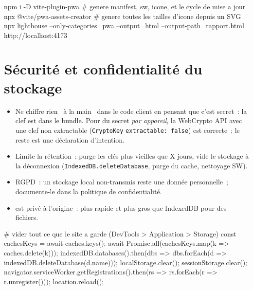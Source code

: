 \begin{terminal}
npm i -D vite-plugin-pwa       # genere manifest, sw, icone, et le cycle de mise a jour
npx @vite/pwa-assets-creator   # genere toutes les tailles d'icone depuis un SVG
npx lighthouse --only-categories=pwa --output=html --output-path=rapport.html http://localhost:4173
\end{terminal}

\section{S\'ecurit\'e et confidentialit\'e du stockage}

\begin{itemize}
  \item Ne chiffre rien \og ~\`a la main~ \fg{} dans le code client en pensant que c'est secret~:
        la clef est dans le bundle. Pour du secret \emph{par appareil}, la WebCrypto API avec une
        clef non extractable (\verb|CryptoKey| \verb|extractable: false|) est correcte~; le reste
        est une d\'eclaration d'intention.
  \item Limite la r\'etention~: purge les cl\'es plus vieilles que X jours, vide le stockage \`a la
        d\'econnexion (\verb|IndexedDB.deleteDatabase|, purge du cache, nettoyage SW).
  \item RGPD~: un stockage local non-transmis reste une donn\'ee personnelle~; documente-le dans la
        politique de confidentialit\'e.
  \item {}
        est priv\'e \`a l'origine~: plus rapide et plus gros que IndexedDB pour des fichiers.
\end{itemize}

\begin{terminal}
# vider tout ce que le site a garde (DevTools > Application > Storage)
const cachesKeys = await caches.keys(); await Promise.all(cachesKeys.map(k => caches.delete(k)));
indexedDB.databases().then(dbs => dbs.forEach(d => indexedDB.deleteDatabase(d.name)));
localStorage.clear(); sessionStorage.clear();
navigator.serviceWorker.getRegistrations().then(rs => rs.forEach(r => r.unregister()));
location.reload();
\end{terminal}

